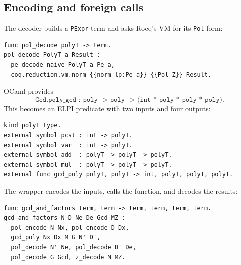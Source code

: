 \documentclass[11pt]{article}
\begin{document}
\subsection{Encoding and foreign calls}
The decoder builds a \texttt{PExpr} term and asks Rocq's VM for its
\texttt{Pol} form:
\begin{lstlisting}
func pol_decode polyT -> term.
pol_decode PolyT_a Result :-
  pe_decode_naive PolyT_a Pe_a,
  coq.reduction.vm.norm {{norm lp:Pe_a}} {{Pol Z}} Result.
\end{lstlisting}
OCaml provides
\[
  \texttt{Gcd.poly\_gcd : poly -> poly -> (int * poly * poly * poly)}.
\]
This becomes an ELPI predicate with two inputs and four outputs:
\begin{lstlisting}
kind polyT type.
external symbol pcst : int -> polyT.
external symbol var  : int -> polyT.
external symbol add  : polyT -> polyT -> polyT.
external symbol mul  : polyT -> polyT -> polyT.
external func gcd_poly polyT, polyT -> int, polyT, polyT, polyT.
\end{lstlisting}
The wrapper encodes the inputs, calls the function, and decodes the results:
\begin{lstlisting}
func gcd_and_factors term, term -> term, term, term, term.
gcd_and_factors N D Ne De Gcd MZ :-
  pol_encode N Nx, pol_encode D Dx,
  gcd_poly Nx Dx M G N' D',
  pol_decode N' Ne, pol_decode D' De,
  pol_decode G Gcd, z_decode M MZ.
\end{lstlisting}
\end{document}
